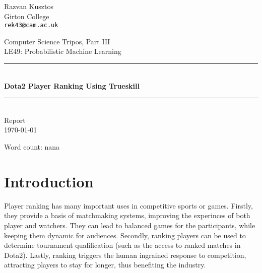 \documentclass[10pt,a4]{article}
\begin{document}


\thispagestyle{empty}

\newcommand{\HRulee}{\rule{\linewidth}{0.5mm}}

\vfil

{\raggedleft \large Razvan Kusztos \\}
{\raggedleft \large Girton College \\}
{\raggedleft \large \tt rek43@cam.ac.uk \\}

\vspace{50pt}

\begin{center}

	{\Large \sc Computer Science Tripos, Part III \\}
	\vspace{10pt}
	{\Large \sc LE49: Probabilistic Machine Learning\\}
	\vspace{20pt}
	\HRulee \\[0.1cm]
	\vspace{10pt}
	{\LARGE \bf Dota2 Player Ranking Using Trueskill\texttrademark}
	\HRulee \\[20pt]
	{\LARGE  Report\\}
	\vspace{20pt}
	{\Large \today \\}
	\vspace{40pt}
\end{center}

\vfill

\begin{flushright}
Word count: nana
\end{flushright}
	
\newpage

\section{Introduction}

Player ranking has many important uses in competitive sports or games. Firstly, 
they provide a basis of matchmaking systems, improving the experinces of both 
player and watchers. They can lead to balanced games for the participants, while 
keeping them dynamic for audiences. Secondly, ranking players can be used to determine 
tournament qualification (such as the access to ranked matches in Dota2). Lastly, 
ranking triggers the human ingrained response to competition, attracting players 
to stay for longer, thus benefiting the industry.
\end{document}
